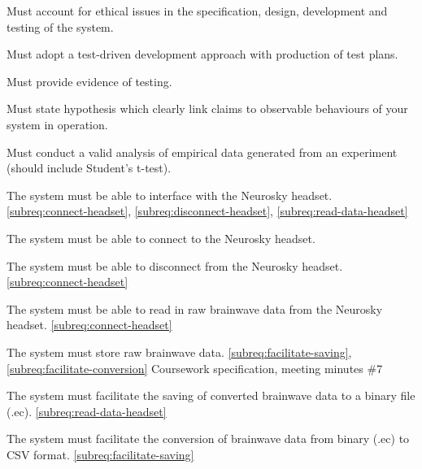 
{Must account for ethical issues in the specification, design, development and testing of the
  system.}
{\phigh}
{\dnone}
{\sspec}


{Must adopt a test-driven development approach with production of test plans.}
{\phigh}
{\dnone}
{\sspec}

{Must provide evidence of testing.}
{\phigh}
{\dnone}
{\sspec}

{Must state hypothesis which clearly link claims to observable behaviours of your system in
  operation.}
{\phigh}
{\dnone}
{\sspec}

{Must conduct a valid analysis of empirical data generated from an experiment (should include
  Student's t-test).}
{\phigh}
{\dnone}
{\sspec}


{The system must be able to interface with the Neurosky headset.}
{\phigh}
{\ref{subreq:connect-headset}, \ref{subreq:disconnect-headset}, \ref{subreq:read-data-headset}}
{}

{The system must be able to connect to the Neurosky headset.}
{\phigh}
{\dnone}
{}

{The system must be able to disconnect from the Neurosky headset.}
{\phigh}
{\ref{subreq:connect-headset}}
{}

{The system must be able to read in raw brainwave data from the Neurosky headset.}
{\phigh}
{\ref{subreq:connect-headset}}
{}

{The system must store raw brainwave data.}
{\phigh}
{\ref{subreq:facilitate-saving}, \ref{subreq:facilitate-conversion}}
{Coursework specification, meeting minutes \#7}

{The system must facilitate the saving of converted brainwave data to a binary file (.ec).}
{\phigh}
{\ref{subreq:read-data-headset}}
{}

{The system must facilitate the conversion of brainwave data from binary (.ec) to CSV format.}
{\phigh}
{\ref{subreq:facilitate-saving}}
{}

